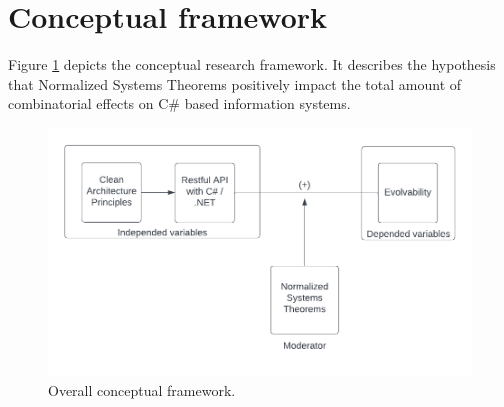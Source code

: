 \section{Conceptual framework} 
\label{conceptualframework}

Figure \ref{fig:overall_conceptual_framework} depicts the conceptual research framework.
It describes the hypothesis that Normalized Systems Theorems positively impact
the total amount of combinatorial effects on C\# based information systems.

\begin{figure}[!h]
    \centering
    \includegraphics[width=1\textwidth]{Figures/overall_conceptual_framework}
    \caption[Overall conceptual framework]{Overall conceptual framework.}
    \label{fig:overall_conceptual_framework}
\end{figure}
